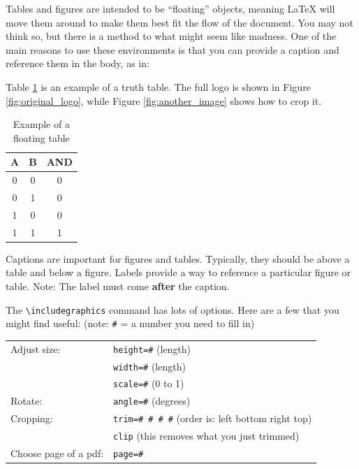 \documentclass[11pt]{article}
\begin{document}
Tables and figures are intended to be ``floating'' objects, meaning LaTeX will move them around to make them best fit the flow of the document.  You may not think so, but there is a method to what might seem like madness. One of the main reasons to use these environments is that you can provide a caption and reference them in the body, as in: 

Table \ref{tbl:example_table} is an example of a truth table. The full logo is shown in Figure \ref{fig:original_logo}, while Figure \ref{fig:another_image} shows how to crop it.


\begin{table}[ht]\centering
	\caption{Example of a floating table}
	\label{tbl:example_table}
	\begin{tabular}{cc|c}
		\toprule
		A & B & AND \\
		\midrule
		0 & 0 & 0 \\
		0 & 1 & 0 \\
		1 & 0 & 0 \\
		1 & 1 & 1 \\
		\bottomrule
	\end{tabular} 
\end{table}

Captions are important for figures and tables.  Typically, they should be above a table and below a figure. Labels provide a way to reference a particular figure or table. Note: The label must come \textbf{after} the caption.  

The \verb|\includegraphics| command has lots of options.  Here are a few that you might find useful:  (note: \texttt{\#} = a number you need to fill in)

\begin{center}
	\begin{tabular}{ll}
		Adjust size:      		& \texttt{height=\#} (length) \\
								& \texttt{width=\#} (length) \\
								& \texttt{scale=\#} (0 to 1) \\
		Rotate:  				& \texttt{angle=\#} (degrees) \\
		Cropping:  				& \texttt{trim=\# \# \# \#} (order is: left bottom right top) \\
								& \texttt{clip} (this removes what you just trimmed) \\
		Choose page of a pdf: 	& \texttt{page=\#} \\
	\end{tabular}
\end{center}
\end{document}

